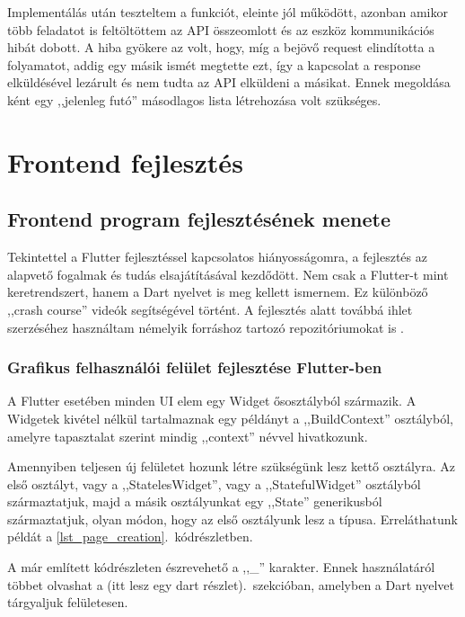 \documentclass{thesis-ekf}
\theoremstyle{definition}
\theoremstyle{remark}
\begin{document}
	Implementálás után teszteltem a funkciót, eleinte jól működött, azonban amikor több feladatot is feltöltöttem az API összeomlott és az eszköz kommunikációs hibát dobott. A hiba gyökere az volt, hogy, míg a bejövő request elindította a folyamatot, addig egy másik ismét megtette ezt, így a kapcsolat a response elküldésével lezárult és nem tudta az API elküldeni a másikat. Ennek megoldása ként egy ,,jelenleg futó'' másodlagos lista létrehozása volt szükséges.
	
	\chapter{Frontend fejlesztés}
	
	\section{Frontend program fejlesztésének menete}
	Tekintettel a Flutter fejlesztéssel kapcsolatos hiányosságomra, a fejlesztés az alapvető fogalmak és tudás elsajátításával kezdődött. Nem csak a Flutter-t mint keretrendszert, hanem a Dart nyelvet is meg kellett ismernem. Ez különböző ,,crash course'' videók segítségével  történt\cite{bib_flutter_fireship,bib_flutter_traversy,bib_flutter_freecodecamp}. A fejlesztés alatt továbbá ihlet szerzéséhez használtam némelyik forráshoz tartozó repozitóriumokat is \cite{bib_flutter_freecodecamp_repo,bib_flutter_traversy_repo}.
	\subsection{Grafikus felhasználói felület fejlesztése Flutter-ben}
	A Flutter esetében minden UI elem egy Widget ősosztályból származik. A Widgetek kivétel nélkül tartalmaznak egy példányt a  ,,BuildContext'' osztályból, amelyre tapasztalat szerint mindig ,,context'' névvel hivatkozunk.
	
	Amennyiben teljesen új felületet hozunk létre szükségünk lesz kettő osztályra. Az első osztályt, vagy a ,,StatelesWidget'', vagy a ,,StatefulWidget'' osztályból származtatjuk, majd a másik osztályunkat egy ,,State'' generikusból származtatjuk, olyan módon, hogy az első osztályunk lesz a típusa. Erreláthatunk példát a \ref{lst_page_creation}.~kódrészletben.
	
	A már említett kódrészleten észrevehető a ,,\_'' karakter. Ennek használatáról többet olvashat a (itt lesz egy dart részlet).~szekcióban, amelyben a Dart nyelvet tárgyaljuk felületesen.
	
\end{document}
